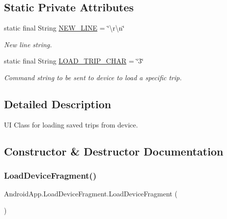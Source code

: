 \subsection*{Static Private Attributes}
\begin{DoxyCompactItemize}
\item 
\mbox{\label{class_android_app_1_1_load_device_fragment_a4ceeef3ad914b52120973b83335a7b72}} 
static final String \hyperlink{class_android_app_1_1_load_device_fragment_a4ceeef3ad914b52120973b83335a7b72}{N\+E\+W\+\_\+\+L\+I\+NE} = \char`\"{}\textbackslash{}r\textbackslash{}n\char`\"{}
\begin{DoxyCompactList}\small\item\em New line string. \end{DoxyCompactList}\item 
\mbox{\label{class_android_app_1_1_load_device_fragment_afdfe423809d2267938f21eb4c5501653}} 
static final String \hyperlink{class_android_app_1_1_load_device_fragment_afdfe423809d2267938f21eb4c5501653}{L\+O\+A\+D\+\_\+\+T\+R\+I\+P\+\_\+\+C\+H\+AR} = \char`\"{}3\char`\"{}
\begin{DoxyCompactList}\small\item\em Command string to be sent to device to load a specific trip. \end{DoxyCompactList}\end{DoxyCompactItemize}


\subsection{Detailed Description}
UI Class for loading saved trips from device. 

\subsection{Constructor \& Destructor Documentation}
\mbox{\label{class_android_app_1_1_load_device_fragment_a2a090a4a947fb44a024a1d3c920b3b63}} 
\subsubsection{\texorpdfstring{Load\+Device\+Fragment()}{LoadDeviceFragment()}}
{\footnotesize\ttfamily Android\+App.\+Load\+Device\+Fragment.\+Load\+Device\+Fragment (\begin{DoxyParamCaption}{ }\end{DoxyParamCaption})\hspace{0.3cm}{\ttfamily [inline]}}



